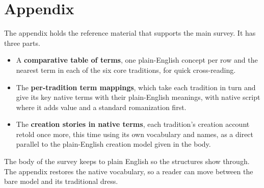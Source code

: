 \chapter{Appendix}

The appendix holds the reference material that supports the main survey. It has three parts.

\begin{itemize}
  \item A \textbf{comparative table of terms}, one plain-English concept per row and the nearest term in each
  of the six core traditions, for quick cross-reading.
  \item The \textbf{per-tradition term mappings}, which take each tradition in turn and give its key native
  terms with their plain-English meanings, with native script where it adds value and a standard romanization
  first.
  \item The \textbf{creation stories in native terms}, each tradition's creation account retold once more,
  this time using its own vocabulary and names, as a direct parallel to the plain-English creation model
  given in the body.
\end{itemize}

The body of the survey keeps to plain English so the structures show through. The appendix restores the
native vocabulary, so a reader can move between the bare model and its traditional dress.
